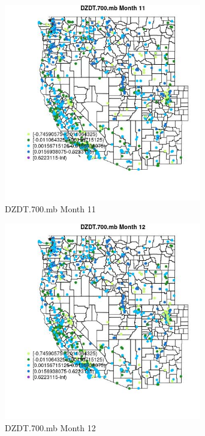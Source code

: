 \begin{figure} 
\centering  
\includegraphics[width=0.77\textwidth]{Code_Outputs/Report_ML_input_PM25_Step4_part_e_de_duplicated_aves_compiled_2019-05-21wNAs_MapObsMo11DZDT700mb.jpg} 
\caption{\label{fig:Report_ML_input_PM25_Step4_part_e_de_duplicated_aves_compiled_2019-05-21wNAsMapObsMo11DZDT700mb}DZDT.700.mb Month 11} 
\end{figure} 
 

\begin{figure} 
\centering  
\includegraphics[width=0.77\textwidth]{Code_Outputs/Report_ML_input_PM25_Step4_part_e_de_duplicated_aves_compiled_2019-05-21wNAs_MapObsMo12DZDT700mb.jpg} 
\caption{\label{fig:Report_ML_input_PM25_Step4_part_e_de_duplicated_aves_compiled_2019-05-21wNAsMapObsMo12DZDT700mb}DZDT.700.mb Month 12} 
\end{figure} 
 

